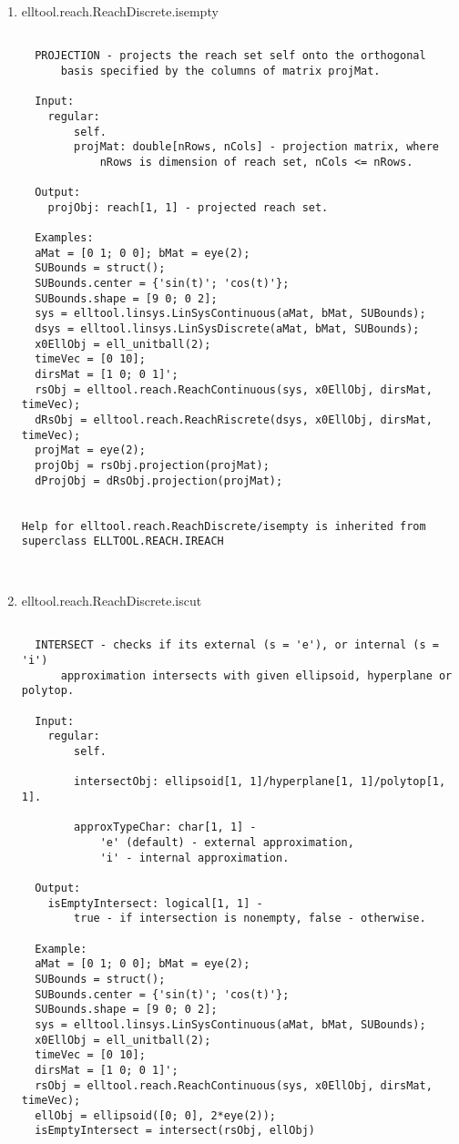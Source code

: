 \begin{enumerate}
\begin{lstlisting}
\end{lstlisting}
\fontfamily{\familydefault}
\selectfont
\item {elltool.reach.ReachDiscrete.isempty}
\selectfont
\begin{lstlisting}

  PROJECTION - projects the reach set self onto the orthogonal
      basis specified by the columns of matrix projMat.

  Input:
    regular:
        self.
        projMat: double[nRows, nCols] - projection matrix, where
            nRows is dimension of reach set, nCols <= nRows.

  Output:
    projObj: reach[1, 1] - projected reach set.

  Examples:
  aMat = [0 1; 0 0]; bMat = eye(2);
  SUBounds = struct();
  SUBounds.center = {'sin(t)'; 'cos(t)'};
  SUBounds.shape = [9 0; 0 2];
  sys = elltool.linsys.LinSysContinuous(aMat, bMat, SUBounds);
  dsys = elltool.linsys.LinSysDiscrete(aMat, bMat, SUBounds);
  x0EllObj = ell_unitball(2);
  timeVec = [0 10];
  dirsMat = [1 0; 0 1]';
  rsObj = elltool.reach.ReachContinuous(sys, x0EllObj, dirsMat, timeVec);
  dRsObj = elltool.reach.ReachRiscrete(dsys, x0EllObj, dirsMat, timeVec);
  projMat = eye(2);
  projObj = rsObj.projection(projMat);
  dProjObj = dRsObj.projection(projMat);


Help for elltool.reach.ReachDiscrete/isempty is inherited from superclass ELLTOOL.REACH.IREACH



\end{lstlisting}
\fontfamily{\familydefault}
\selectfont
\item {elltool.reach.ReachDiscrete.iscut}
\selectfont
\begin{lstlisting}

  INTERSECT - checks if its external (s = 'e'), or internal (s = 'i')
      approximation intersects with given ellipsoid, hyperplane or polytop.

  Input:
    regular:
        self.

        intersectObj: ellipsoid[1, 1]/hyperplane[1, 1]/polytop[1, 1].

        approxTypeChar: char[1, 1] -
            'e' (default) - external approximation,
            'i' - internal approximation.

  Output:
    isEmptyIntersect: logical[1, 1] -
        true - if intersection is nonempty, false - otherwise.

  Example:
  aMat = [0 1; 0 0]; bMat = eye(2);
  SUBounds = struct();
  SUBounds.center = {'sin(t)'; 'cos(t)'};
  SUBounds.shape = [9 0; 0 2];
  sys = elltool.linsys.LinSysContinuous(aMat, bMat, SUBounds);
  x0EllObj = ell_unitball(2);
  timeVec = [0 10];
  dirsMat = [1 0; 0 1]';
  rsObj = elltool.reach.ReachContinuous(sys, x0EllObj, dirsMat, timeVec);
  ellObj = ellipsoid([0; 0], 2*eye(2));
  isEmptyIntersect = intersect(rsObj, ellObj)


\end{lstlisting}
\end{enumerate}
